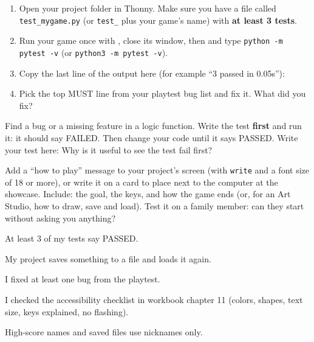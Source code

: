 \namedateline

\begin{core}
\begin{enumerate}
  \item Open your project folder in Thonny. Make sure you have a file called \texttt{test\_mygame.py} (or \texttt{test\_} plus your game's name) with \textbf{at least 3 tests}.
  \item Run your game once with , close its window, then  and type \texttt{python -m pytest -v} (or \texttt{python3 -m pytest -v}).
  \item Copy the last line of the output here (for example \enquote{3 passed in 0.05s}): 
  \item Pick the top MUST line from your playtest bug list and fix it. What did you fix? 
\end{enumerate}
\end{core}

\begin{challenge}
Find a bug or a missing feature in a logic function. Write the test \textbf{first} and run it: it
should say FAILED. Then change your code until it says PASSED. Write your test here:
\answerspace{3cm}
Why is it useful to see the test fail first? 
\end{challenge}

\begin{creative}
Add a \enquote{how to play} message to your project's screen (with \texttt{write} and a font size of
18 or more), or write it on a card to place next to the computer at the showcase. Include: the goal,
the keys, and how the game ends (or, for an Art Studio, how to draw, save and load). Test it on a
family member: can they start without asking you anything?
\end{creative}

\begin{selfcheck}
  \item At least 3 of my tests say PASSED.
  \item My project saves something to a file and loads it again.
  \item I fixed at least one bug from the playtest.
  \item I checked the accessibility checklist in workbook chapter 11 (colors, shapes, text size, keys explained, no flashing).
  \item High-score names and saved files use nicknames only.
\end{selfcheck}
